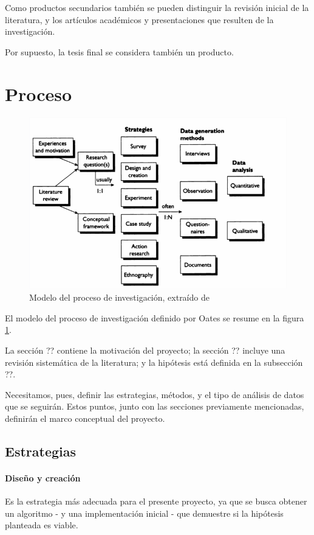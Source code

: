 Como productos secundarios también se pueden distinguir la revisión inicial de
la literatura\cite{Alvarez2019}, y los artículos académicos y presentaciones
que resulten de la investigación.

Por supuesto, la tesis final se considera también un producto.

\newpage

\section{Proceso}
\begin{figure}
  \centering
  \includegraphics[width=\linewidth]{images/2_methodology/modelo_proceso.png}
  \caption{Modelo del proceso de investigación, extraído de \cite{Oates2006}}
  \label{fig:proceso}
\end{figure}

El modelo del proceso de investigación definido por Oates se resume en la
figura \ref{fig:proceso}.

La sección ?? contiene la motivación del proyecto;
la sección ?? incluye una revisión sistemática de la literatura;
y la hipótesis está definida en la subsección ??.

Necesitamos, pues, definir las estrategias, métodos, y el tipo de análisis de
datos que se seguirán. Estos puntos, junto con las secciones previamente mencionadas,
definirán el marco conceptual del proyecto.

\subsection{Estrategias}
\paragraph{Diseño y creación} Es la estrategia más adecuada para el presente
proyecto, ya que se busca obtener un algoritmo - y una implementación inicial -
que demuestre si la hipótesis planteada es viable.

